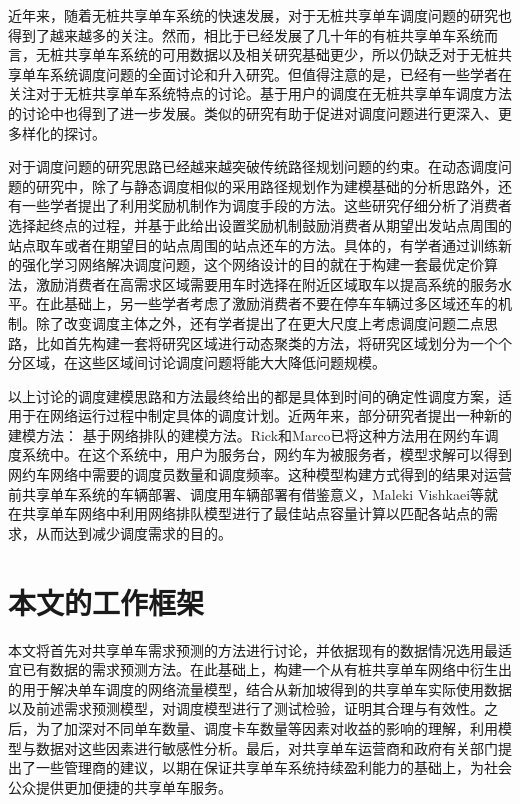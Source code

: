 \documentclass[]{tongjithesis}
\numberwithin{equation}{chapter}
\begin{document}
近年来，随着无桩共享单车系统的快速发展，对于无桩共享单车调度问题的研究也得到了越来越多的关注。然而，相比于已经发展了几十年的有桩共享单车系统而言，无桩共享单车系统的可用数据以及相关研究基础更少，所以仍缺乏对于无桩共享单车系统调度问题的全面讨论和升入研究。但值得注意的是，已经有一些学者在关注对于无桩共享单车系统特点的讨论\cite{shen2018understanding,li2019operating,xing2020exploring}。基于用户的调度在无桩共享单车调度方法的讨论中也得到了进一步发展。类似的研究有助于促进对调度问题进行更深入、更多样化的探讨。

对于调度问题的研究思路已经越来越突破传统路径规划问题的约束。在动态调度问题的研究中，除了与静态调度相似的采用路径规划作为建模基础的分析思路外，还有一些学者提出了利用奖励机制作为调度手段的方法\cite{fricker2016incentives,ghosh2017incentivizing}。这些研究仔细分析了消费者选择起终点的过程，并基于此给出设置奖励机制鼓励消费者从期望出发站点周围的站点取车或者在期望目的站点周围的站点还车的方法。具体的，有学者通过训练新的强化学习网络解决调度问题，这个网络设计的目的就在于构建一套最优定价算法，激励消费者在高需求区域需要用车时选择在附近区域取车以提高系统的服务水平\cite{pan2019deep}。在此基础上，另一些学者考虑了激励消费者不要在停车车辆过多区域还车的机制\cite{duan2019optimizing,ji2020does}。除了改变调度主体之外，还有学者提出了在更大尺度上考虑调度问题二点思路，比如首先构建一套将研究区域进行动态聚类的方法，将研究区域划分为一个个分区域，在这些区域间讨论调度问题将能大大降低问题规模\cite{caggiani2017dynamic}。

以上讨论的调度建模思路和方法最终给出的都是具体到时间的确定性调度方案，适用于在网络运行过程中制定具体的调度计划。近两年来，部分研究者提出一种新的建模方法： 基于网络排队的建模方法。Rick和Marco已将这种方法用在网约车调度系统中\cite{zhang2015queueing}。在这个系统中，用户为服务台，网约车为被服务者，模型求解可以得到网约车网络中需要的调度员数量和调度频率。这种模型构建方式得到的结果对运营前共享单车系统的车辆部署、调度用车辆部署有借鉴意义，Maleki Vishkaei等就在共享单车网络中利用网络排队模型进行了最佳站点容量计算以匹配各站点的需求，从而达到减少调度需求的目的\cite{vishkaei2020balancing}。

\section{本文的工作框架}
本文将首先对共享单车需求预测的方法进行讨论，并依据现有的数据情况选用最适宜已有数据的需求预测方法。在此基础上，构建一个从有桩共享单车网络中衍生出的用于解决单车调度的网络流量模型，结合从新加坡得到的共享单车实际使用数据以及前述需求预测模型，对调度模型进行了测试检验，证明其合理与有效性。之后，为了加深对不同单车数量、调度卡车数量等因素对收益的影响的理解，利用模型与数据对这些因素进行敏感性分析。最后，对共享单车运营商和政府有关部门提出了一些管理商的建议，以期在保证共享单车系统持续盈利能力的基础上，为社会公众提供更加便捷的共享单车服务。
\end{document}
